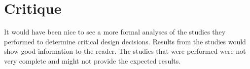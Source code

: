 \documentclass{article}
\begin{document}
\section*{Critique}
It would have been nice to see a more formal analyses of the studies they performed to determine critical design decisions. Results from the studies would show good information to the reader. The studies that were performed were not very complete and might not provide the expected results.
\cite{Lee_2009_6317}
\end{document}
